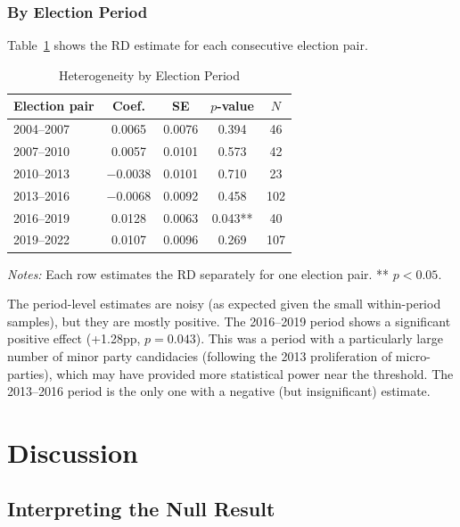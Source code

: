 \documentclass[12pt, a4paper]{article}
\begin{document}
\subsubsection{By Election Period}

Table~\ref{tab:by_period} shows the RD estimate for each consecutive election pair.

\begin{table}[H]
\centering
\caption{Heterogeneity by Election Period}
\label{tab:by_period}
\begin{tabular}{lcccc}
\toprule
\textbf{Election pair} & \textbf{Coef.} & \textbf{SE} & \textbf{$p$-value} & \textbf{$N$} \\
\midrule
2004--2007 & 0.0065 & 0.0076 & 0.394 & 46 \\
2007--2010 & 0.0057 & 0.0101 & 0.573 & 42 \\
2010--2013 & $-$0.0038 & 0.0101 & 0.710 & 23 \\
2013--2016 & $-$0.0068 & 0.0092 & 0.458 & 102 \\
2016--2019 & 0.0128 & 0.0063 & 0.043** & 40 \\
2019--2022 & 0.0107 & 0.0096 & 0.269 & 107 \\
\bottomrule
\end{tabular}
\begin{minipage}{\textwidth}
\vspace{0.3em}
\footnotesize
\textit{Notes:} Each row estimates the RD separately for one election pair. ** $p < 0.05$.
\end{minipage}
\end{table}

The period-level estimates are noisy (as expected given the small within-period samples), but they are mostly positive. The 2016--2019 period shows a significant positive effect (+1.28pp, $p = 0.043$). This was a period with a particularly large number of minor party candidacies (following the 2013 proliferation of micro-parties), which may have provided more statistical power near the threshold. The 2013--2016 period is the only one with a negative (but insignificant) estimate.

\section{Discussion}
\label{sec:discussion}

\subsection{Interpreting the Null Result}
\end{document}
